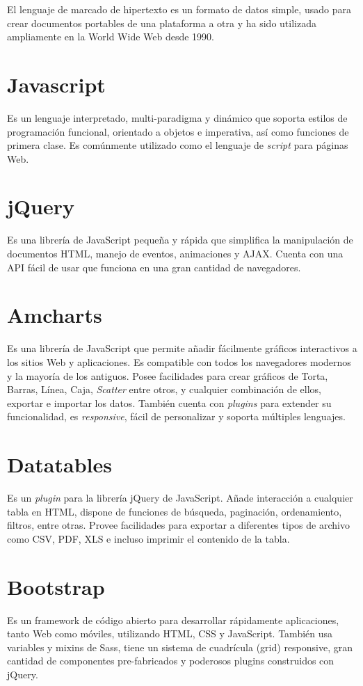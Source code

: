 El lenguaje de marcado de hipertexto es un formato de datos simple, usado para crear documentos portables de una plataforma a otra y ha sido utilizada ampliamente en la World Wide Web desde 1990. \cite{RFC1866}

\section{Javascript}

Es un lenguaje interpretado, multi-paradigma y dinámico que soporta estilos de programación funcional,  orientado a objetos e imperativa, así como funciones de primera clase. Es comúnmente utilizado como el lenguaje de \textit{script} para páginas Web. \cite{javascript}

\section{jQuery} 

Es una librería de JavaScript pequeña y rápida que simplifica la manipulación de documentos HTML, manejo de eventos, animaciones y AJAX. Cuenta con una API fácil de usar que funciona en una gran cantidad de navegadores. 

\section{Amcharts}

Es una librería de JavaScript que permite añadir fácilmente gráficos interactivos a los sitios Web y aplicaciones. Es compatible con todos los navegadores modernos y la mayoría de los antiguos. Posee facilidades para crear gráficos de Torta, Barras, Línea, Caja, \textit{Scatter} entre otros, y cualquier combinación de ellos, exportar e importar los datos. También cuenta con \textit{plugins} para extender su funcionalidad, es \textit{responsive}, fácil de personalizar y soporta múltiples lenguajes. \cite{Amcharts}

\section{Datatables}

Es un \textit{plugin} para la librería jQuery de JavaScript. Añade interacción a cualquier tabla en HTML, dispone de funciones de búsqueda, paginación, ordenamiento, filtros, entre otras. Provee facilidades para exportar a diferentes tipos de archivo como CSV, PDF, XLS e incluso imprimir el contenido de la tabla. 

\section{Bootstrap}
Es un framework de código abierto para desarrollar rápidamente aplicaciones, tanto Web como móviles, utilizando HTML, CSS y JavaScript. También usa variables y mixins de Sass, tiene un sistema de cuadrícula (grid) responsive, gran cantidad de componentes pre-fabricados y poderosos plugins construidos con  jQuery.
